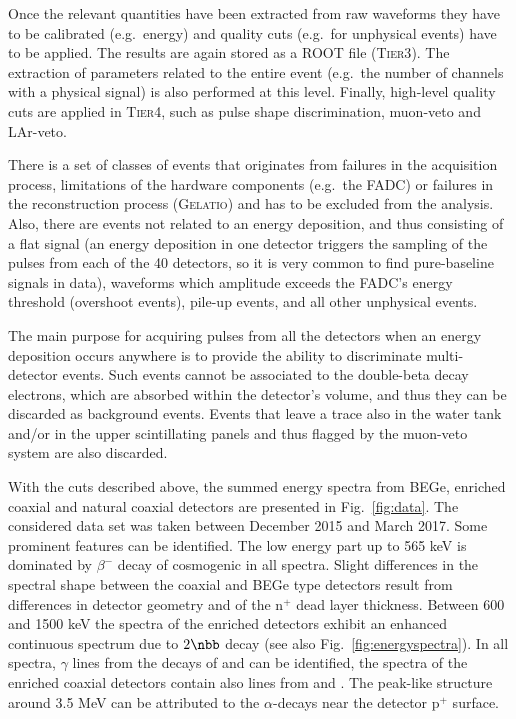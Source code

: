Once the relevant quantities have been extracted from raw waveforms they have to be calibrated (e.g.~energy) and quality cuts (e.g.~for unphysical events) have to be applied. The results are again stored as a ROOT file (\textsc{Tier3}). The extraction of parameters related to the entire event (e.g.~the number of channels with a physical signal) is also performed at this level. Finally, high-level quality cuts are applied in \textsc{Tier4}, such as pulse shape discrimination, muon-veto and LAr-veto.

 There is a set of classes of events that originates from failures in the acquisition process, limitations of the hardware components (e.g.~the FADC) or failures in the reconstruction process (\textsc{Gelatio}) and has to be excluded from the analysis. Also, there are events not related to an energy deposition, and thus consisting of a flat signal (an energy deposition in one detector triggers the sampling of the pulses from each of the 40 detectors, so it is very common to find pure-baseline signals in data), waveforms which amplitude exceeds the FADC's energy threshold (overshoot events), pile-up events, and all other unphysical events.

The main purpose for acquiring pulses from all the detectors when an energy deposition occurs anywhere is to provide the ability to discriminate multi-detector events. Such events cannot be associated to the double-beta decay electrons, which are absorbed within the detector's volume, and thus they can be discarded as background events. Events that leave a trace also in the water tank and/or in the upper scintillating panels and thus flagged by the muon-veto system are also discarded.

 With the cuts described above, the summed energy spectra from BEGe, enriched coaxial and natural coaxial detectors are presented in Fig.~\ref{fig:data}. The considered data set was taken between December 2015 and March 2017. Some prominent features can be identified. The low energy part up to 565 keV is dominated by $\beta^-$ decay of cosmogenic  in all spectra. Slight differences in the spectral shape between the coaxial and BEGe type detectors result from differences in detector geometry and of the n$^+$ dead layer thickness. Between 600 and 1500 keV the spectra of the enriched detectors exhibit an enhanced continuous spectrum due to $2\nbb$ decay (see also Fig.~\ref{fig:energyspectra}). In all spectra, $\gamma$ lines from the decays of  and  can be identified, the spectra of the enriched coaxial detectors contain also lines from  and . The peak-like structure around 3.5 MeV can be attributed to the $\alpha$-decays near the detector p$^+$ surface.

